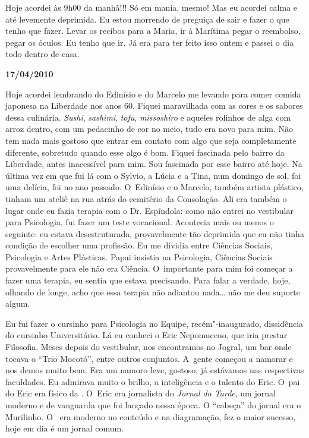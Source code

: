Hoje acordei às 9h00 da manhã!!! Só em mania, mesmo! Mas eu acordei
calma e até levemente deprimida. Eu estou morrendo de preguiça de sair e
fazer o que tenho que fazer. Levar os recibos para a Maria, ir à
Marítima pegar o reembolso, pegar os óculos. Eu tenho que ir. Já era
para ter feito isso ontem e passei o dia todo dentro de casa.

\begin{flushright}\textbf{17/04/2010}\end{flushright}


Hoje acordei lembrando do Edinísio e do Marcelo me levando para comer
comida japonesa na Liberdade nos anos 60. Fiquei maravilhada com as
cores e os sabores dessa culinária. \emph{Sushi}, \emph{sashimi},
\emph{tofu}, \emph{missoshiro} e aqueles rolinhos de alga com arroz
dentro, com um pedacinho de cor no meio, tudo era novo para mim. Não tem
nada mais gostoso que entrar em contato com algo que seja completamente
diferente, sobretudo quando esse algo é bom. Fiquei fascinada pelo
bairro da Liberdade, antes inacessível para mim. Sou fascinada por esse
bairro até hoje. Na última vez em que fui lá com o Sylvio, a Lúcia e a
Tina, num domingo de sol, foi uma delícia, foi no ano passado. O~Edinísio e o Marcelo, também artista plástico, tinham um ateliê na rua
atrás do cemitério da Consolação. Ali era também o lugar onde eu fazia
terapia com o Dr. Espíndola: como não entrei no vestibular para
Psicologia, fui fazer um teste vocacional. Acontecia mais ou menos o
seguinte: eu estava desestruturada, provavelmente tão deprimida que eu
não tinha condição de escolher uma profissão. Eu me dividia entre
Ciências Sociais, Psicologia e Artes Plásticas. Papai insistia na
Psicologia, Ciências Sociais provavelmente para ele não era Ciência. O~importante para mim foi começar a fazer uma terapia, eu sentia que
estava precisando. Para falar a verdade, hoje, olhando de longe, acho
que essa terapia não adiantou nada… não me deu suporte algum.

Eu fui fazer o cursinho para Psicologia no Equipe, recém"-inaugurado,
dissidência do cursinho Universitário. Lá eu conheci o Eric Nepomuceno,
que iria prestar Filosofia. Meses depois do vestibular, nos encontramos
no Jogral, um bar onde tocava o ``Trio Mocotó'', entre outros conjuntos.
A~gente começou a namorar e nos demos muito bem. Era um namoro leve,
gostoso, já estávamos nas respectivas faculdades. Eu admirava muito o
brilho, a inteligência e o talento do Eric. O~pai do Eric era físico da
. O~Eric era jornalista do \emph{Jornal da Tarde}, um jornal moderno
e de vanguarda que foi lançado nessa época. O ``cabeça'' do jornal era o
Murilinho. O~ era moderno no conteúdo e na diagramação, fez o maior
sucesso, hoje em dia é um jornal comum.


